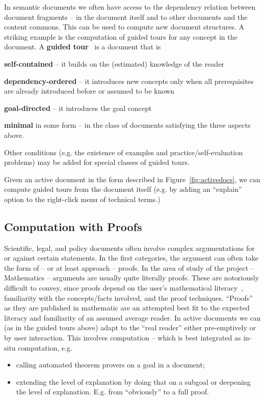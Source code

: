 In semantic documents we often have access to the dependency relation between document
fragments -- in the document itself and to other documents and the content commons. This
can be used to compute new document structures. A striking example is the computation of
guided tours for any concept in the document. A \textbf{guided
  tour}~\cite{KohDavGin:psewads11} is a document that is
\begin{compactitem}
\item \textbf{self-contained} -- it builds on the (estimated) knowledge of the reader
\item \textbf{dependency-ordered} -- it introduces new concepts only when all prerequisites are
  already introduced before or assumed to be known
\item \textbf{goal-directed} -- it introduces the goal concept
\item \textbf{minimal} in some form -- in the class of documents satisfying the three
  aspects above.
\end{compactitem}
Other conditions (e.g. the existence of examples and practice/self-evaluation problems)
may be added for special classes of guided tours.

Given an active document in the form described in Figure~\ref{fig:activedocs}, we can
compute guided tours from the document itself (e.g. by adding an ``explain'' option to the
right-click menu of technical terms.)

\subsection{Computation with Proofs}\label{sec:ex:proofs}

Scientific, legal, and policy documents often involve complex argumentations for or
against certain statements. In the first categories, the argument can often take the form
of -- or at least approach -- proofs. In the area of study of the \pn project --
Mathematics -- arguments are usually quite literally proofs. These are notoriously
difficult to convey, since proofs depend on the user's mathematical
literacy~\cite{IanKoh:mlkmim15}, familiarity with the concepts/facts involved, and the
proof techniques. ``Proofs'' as they are published in mathematic are an attempted best fit
to the expected literacy and familiarity of an assumed average reader. In active documents
we can (as in the guided tours above) adapt to the ``real reader'' either pre-emptively or
by user interaction. This involves computation -- which is best integrated as in-situ
computation, e.g.
\begin{itemize}
  \item calling automated theorem provers on a goal in a document;
  \item extending the level of explanation by doing that on a subgoal or deepening the
    level of explanation. E.g. from ``obviously'' to a full proof.
  \end{itemize}






